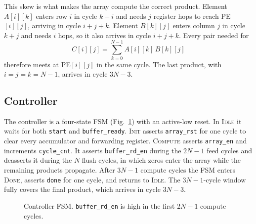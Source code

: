 \documentclass[conference]{IEEEtran}
\begin{document}
This skew is what makes the array compute the correct product. Element $A[i][k]$ enters row $i$
in cycle $k+i$ and needs $j$ register hops to reach PE$[i][j]$, arriving in cycle $i+j+k$.
Element $B[k][j]$ enters column $j$ in cycle $k+j$ and needs $i$ hops, so it also arrives in
cycle $i+j+k$. Every pair needed for
\begin{equation}
C[i][j] = \sum_{k=0}^{N-1} A[i][k]\,B[k][j]
\end{equation}
therefore meets at PE$[i][j]$ in the same cycle. The last product, with $i=j=k=N-1$, arrives in
cycle $3N-3$.

\subsection{Controller}
The controller is a four-state FSM (Fig.~\ref{fig:fsm}) with an active-low reset. In
\textsc{Idle} it waits for both \texttt{start} and \texttt{buffer\_ready}. \textsc{Init}
asserts \texttt{array\_rst} for one cycle to clear every accumulator and forwarding register.
\textsc{Compute} asserts \texttt{array\_en} and increments \texttt{cycle\_cnt}. It asserts
\texttt{buffer\_rd\_en} during the $2N-1$ feed cycles and deasserts it during the $N$ flush
cycles, in which zeros enter the array while the remaining products propagate. After $3N-1$
compute cycles the FSM enters \textsc{Done}, asserts \texttt{done} for one cycle, and returns
to \textsc{Idle}. The $3N-1$-cycle window fully covers the final product, which arrives in cycle
$3N-3$.

\begin{figure}[t]
\centering
{}
\caption{Controller FSM. \texttt{buffer\_rd\_en} is high in the first $2N-1$ compute cycles.}
\label{fig:fsm}
\end{figure}
\end{document}
